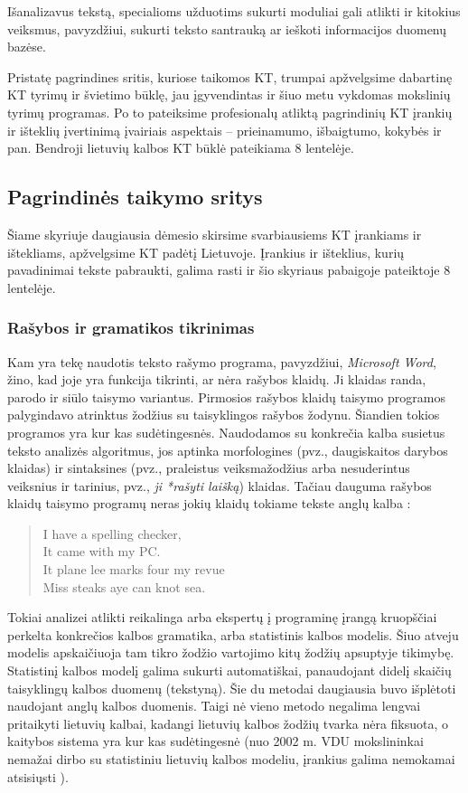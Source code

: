 \begin{multicols}{2}
Išanalizavus tekstą, specialioms užduotims sukurti moduliai gali atlikti ir kitokius veiksmus, pavyzdžiui, sukurti teksto santrauką ar ieškoti informacijos duomenų bazėse.
 
Pristatę pagrindines sritis, kuriose taikomos KT, trumpai apžvelgsime dabartinę KT tyrimų ir švietimo būklę, jau įgyvendintas ir šiuo metu vykdomas mokslinių tyrimų programas. Po to pateiksime profesionalų atliktą pagrindinių KT įrankių ir išteklių įvertinimą įvairiais aspektais – prieinamumo, išbaigtumo, kokybės ir pan. Bendroji lietuvių kalbos KT būklė pateikiama 8 lentelėje.

\subsection{Pagrindinės taikymo sritys} 

Šiame skyriuje daugiausia dėmesio skirsime svarbiausiems KT įrankiams ir ištekliams, apžvelgsime KT padėtį Lietuvoje. Įrankius ir išteklius, kurių pavadinimai tekste pabraukti, galima rasti ir šio skyriaus pabaigoje pateiktoje 8 lentelėje. 

\subsubsection{Rašybos ir gramatikos tikrinimas}

Kam yra tekę naudotis teksto rašymo programa, pavyzdžiui, \textit{Microsoft Word}, žino, kad joje yra funkcija tikrinti, ar nėra rašybos klaidų. Ji klaidas randa, parodo ir siūlo taisymo variantus. Pirmosios rašybos klaidų taisymo programos palygindavo atrinktus žodžius su taisyklingos rašybos žodynu. Šiandien tokios programos yra kur kas sudėtingesnės. Naudodamos su konkrečia kalba susietus teksto analizės algoritmus, jos aptinka morfologines (pvz., daugiskaitos darybos klaidas) ir sintaksines (pvz., praleistus veiksmažodžius arba nesuderintus veiksnius ir tarinius, pvz., \textit{ji *rašyti laišką}) klaidas. Tačiau dauguma rašybos klaidų taisymo programų neras jokių klaidų tokiame tekste anglų kalba \cite{zar1}:

\begin{quote}
  I have a spelling checker,\\
  It came with my PC.\\
  It plane lee marks four my revue\\
  Miss steaks aye can knot sea.
\end{quote}

Tokiai analizei atlikti reikalinga arba ekspertų į programinę įrangą kruopščiai perkelta konkrečios kalbos gramatika, arba statistinis kalbos modelis. Šiuo atveju modelis apskaičiuoja tam tikro žodžio vartojimo kitų žodžių apsuptyje tikimybę. Statistinį kalbos modelį galima sukurti automatiškai, panaudojant didelį skaičių taisyklingų kalbos duomenų (tekstyną). Šie du metodai daugiausia buvo išplėtoti naudojant anglų kalbos duomenis. Taigi nė vieno metodo negalima lengvai pritaikyti lietuvių kalbai, kadangi lietuvių kalbos žodžių tvarka nėra fiksuota, o kaitybos sistema yra kur kas sudėtingesnė (nuo 2002 m. VDU mokslininkai nemažai dirbo su statistiniu lietuvių kalbos modeliu, įrankius galima nemokamai atsisiųsti \cite{airenas}).   


\end{multicols}
